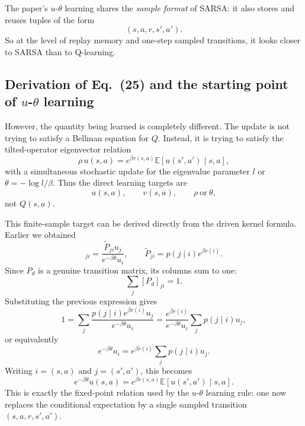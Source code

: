 \documentclass[11pt]{article}
\begin{document}
The paper's \(u\)-\(\theta\) learning shares the \emph{sample format} of SARSA: it also stores
and reuses tuples of the form
\begin{equation}
    (s,a,r,s',a').
\end{equation}
So at the level of replay memory and one-step sampled transitions, it looks closer to SARSA than
to Q-learning.

\subsection{Derivation of Eq.~(25) and the starting point of \(u\)-\(\theta\) learning}

However, the quantity being learned is completely different. The update is not trying to satisfy
a Bellman equation for \(Q\). Instead, it is trying to satisfy the tilted-operator eigenvector
relation
\begin{equation}
    \rho\,u(s,a)
    =
    e^{\beta r(s,a)}
    \mathbb E\!\left[u(s',a')\mid s,a\right],
\end{equation}
with a simultaneous stochastic update for the eigenvalue parameter \(l\) or
\(\theta=-\log l/\beta\). Thus the direct learning targets are
\begin{equation}
    u(s,a), \qquad v(s,a), \qquad \rho \ \text{or}\ \theta,
\end{equation}
not \(Q(s,a)\).

This finite-sample target can be derived directly from the driven kernel formula. Earlier we
obtained
\begin{equation}
    [P_d]_{ji}
    =
    \frac{\widetilde P_{ji}u_j}{e^{-\beta\theta}u_i},
    \qquad
    \widetilde P_{ji}=p(j\mid i)e^{\beta r(i)}.
\end{equation}
Since \(P_d\) is a genuine transition matrix, its columns sum to one:
\begin{equation}
    \sum_j [P_d]_{ji}=1.
\end{equation}
Substituting the previous expression gives
\begin{equation}
    1
    =
    \sum_j
    \frac{p(j\mid i)e^{\beta r(i)}u_j}{e^{-\beta\theta}u_i}
    =
    \frac{e^{\beta r(i)}}{e^{-\beta\theta}u_i}
    \sum_j p(j\mid i)u_j,
\end{equation}
or equivalently
\begin{equation}
    e^{-\beta\theta}u_i
    =
    e^{\beta r(i)}\sum_j p(j\mid i)u_j.
\end{equation}
Writing \(i=(s,a)\) and \(j=(s',a')\), this becomes
\begin{equation}
    e^{-\beta\theta}u(s,a)
    =
    e^{\beta r(s,a)}
    \mathbb E\!\left[u(s',a')\mid s,a\right].
\end{equation}
This is exactly the fixed-point relation used by the \(u\)-\(\theta\) learning rule: one now
replaces the conditional expectation by a single sampled transition \((s,a,r,s',a')\).
\end{document}
